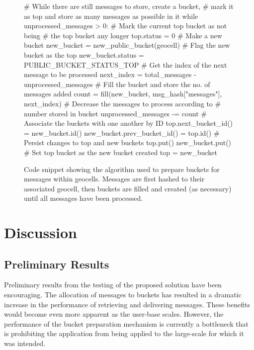 \documentclass{article}
\begin{document}
\begin{figure}
\begin{center}
\begin{minipage}{5.5in}
\begin{python}
    # While there are still messages to store, create a bucket,
    # mark it as top and store as many messages as possible in it   
    while unprocessed_messages > 0:
      # Mark the current top bucket as not being
      # the top bucket any longer
      top.status = 0
      # Make a new bucket
      new_bucket = new_public_bucket(geocell)
      # Flag the new bucket as the top
      new_bucket.status = PUBLIC_BUCKET_STATUS_TOP
      # Get the index of the next message to be processed
      next_index = total_messages - unprocessed_messages
      # Fill the bucket and store the no. of messages added
      count = fill(new_bucket, msg_hash["messages"], next_index)
      # Decrease the messages to process according to
      # number stored in bucket
      unprocessed_messages -= count
      # Associate the buckets with one another by ID
      top.next_bucket_id() = new_bucket.id()
      new_bucket.prev_bucket_id() = top.id()
      # Persist changes to top and new buckets
      top.put()
      new_bucket.put()
      # Set top bucket as the new bucket created
      top = new_bucket
\end{python}
\end{minipage}
\caption{Code snippet showing the algorithm used to prepare buckets for messages within geocells. Messages are first hashed to their associated geocell, then buckets are filled and created (as necessary) until all messages have been processed.\label{fig:bucket_preparation_algorithm}}
\end{center}
\end{figure}



\section{Discussion} %
\label{sec:discussion}

\subsection{Preliminary Results} %
\label{sub:preliminary_results}

Preliminary results from the testing of the proposed solution have been encouraging. The allocation of messages to buckets has resulted in a dramatic increase in the performance of retrieving and delivering messages. These benefits would become even more apparent as the user-base scales. However, the performance of the bucket preparation mechanism is currently a bottleneck that is prohibiting the application from being applied to the large-scale for which it was intended.
\end{document}
